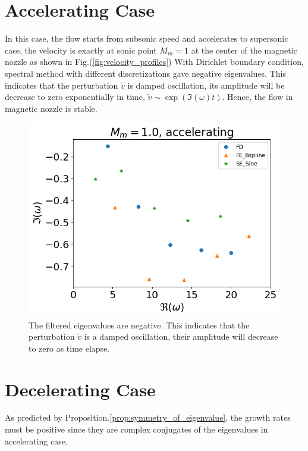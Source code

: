 \section{Accelerating Case}
In this case, the flow starts from subsonic speed and accelerates to supersonic case, the velocity is exactly at sonic point $M_m=1$ at the center of the magnetic nozzle as shown in Fig.(\ref{fig:velocity_profiles})
With Dirichlet boundary condition, spectral method with different discretizations gave negative eigenvalues. This indicates that the perturbation $\tilde{v}$ is damped oscillation, its amplitude will be decrease to zero exponentially in time, $\tilde{v} \sim \exp(\Im(\omega)t)$. Hence, the flow in magnetic nozzle is stable.
\begin{figure} [H]
	\centering
	\includegraphics[width=0.7\linewidth]{img/numerical_experiments/accelerating_v}
	\caption{The filtered eigenvalues are negative. This indicates that the perturbation $\tilde{v}$ is a damped oscillation, their amplitude will decrease to zero as time elapse.}
	\label{fig:accelerating_v}
\end{figure}


\section{Decelerating Case}
As predicted by Proposition.\ref{prop:symmetry_of_eigenvalue}, the growth rates must be positive since they are complex conjugates of the eigenvalues in accelerating case.

